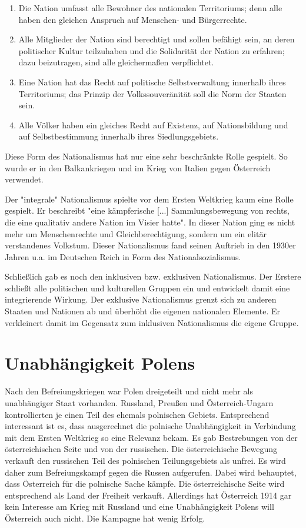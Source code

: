 \documentclass[10pt,a4paper,oneside,ngerman,numbers=noenddot]{scrartcl}
\begin{document}
\begin{enumerate}
    \item Die Nation umfasst alle Bewohner des nationalen Territoriums; denn
    alle haben den gleichen Anspruch auf Menschen- und Bürgerrechte.
    \item Alle Mitglieder der Nation sind berechtigt und sollen befähigt sein, an
    deren politischer Kultur teilzuhaben und die Solidarität der Nation zu erfahren;
    dazu beizutragen, sind alle gleichermaßen verpflichtet.
    \item Eine Nation hat das Recht auf politische Selbstverwaltung innerhalb ihres
    Territoriums; das Prinzip der Volkssouveränität soll die Norm der Staaten sein.
    \item Alle Völker haben ein gleiches Recht auf Existenz, auf Nationsbildung und
    auf Selbstbestimmung innerhalb ihres Siedlungsgebiets.
\end{enumerate}

Diese Form des Nationalismus hat nur eine sehr beschränkte Rolle gespielt. So
wurde er in den Balkankriegen und im Krieg von Italien gegen Österreich
verwendet.

Der "integrale" Nationalismus spielte vor dem Ersten Weltkrieg kaum eine Rolle
gespielt. Er beschreibt "eine kämpferische [...] Sammlungsbewegung von rechts,
die eine qualitativ andere Nation im Visier hatte". In dieser Nation ging es
nicht mehr um Menschenrechte und Gleichberechtigung, sondern um ein elitär
verstandenes Volkstum. Dieser Nationalismus fand seinen Auftrieb in den 1930er
Jahren u.a. im Deutschen Reich in Form des Nationalsozialismus.

Schließlich gab es noch den inklusiven bzw. exklusiven Nationalismus. Der Erstere
schließt alle politischen und kulturellen Gruppen ein und entwickelt damit eine
integrierende Wirkung. Der exklusive Nationalismus grenzt sich zu anderen Staaten
und Nationen ab und überhöht die eigenen nationalen Elemente. Er verkleinert damit
im Gegensatz zum inklusiven Nationalismus die eigene Gruppe.

\section*{Unabhängigkeit Polens}

Nach den Befreiungskriegen war Polen dreigeteilt und nicht mehr als unabhängiger
Staat vorhanden. Russland, Preußen und Österreich-Ungarn kontrollierten je einen
Teil des ehemals polnischen Gebiets. Entsprechend interessant ist es, dass
ausgerechnet die polnische Unabhängigkeit in Verbindung mit dem Ersten Weltkrieg
so eine Relevanz bekam. Es gab Bestrebungen von der österreichischen Seite und
von der russischen.
Die österreichische Bewegung verkauft den russischen Teil
des polnischen Teilungsgebiets als unfrei. Es wird daher zum Befreiungskampf
gegen die Russen aufgerufen. Dabei wird behauptet, dass Österreich für die
polnische Sache kämpfe. Die österreichische Seite wird entsprechend als Land der
Freiheit verkauft. Allerdings hat Österreich 1914 gar kein Interesse am Krieg
mit Russland und eine Unabhängigkeit Polens will Österreich auch nicht.
Die Kampagne hat wenig Erfolg.
\end{document}
